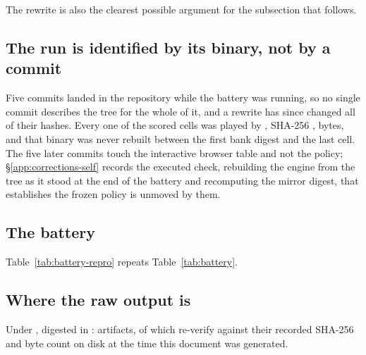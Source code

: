The rewrite is also the clearest possible argument for the subsection that follows.

\subsection*{The run is identified by its binary, not by a commit}

Five commits landed in the repository while the battery was running, so no single commit describes the
tree for the whole of it, and a rewrite has since changed all of their hashes. Every one of the \vsevenScoredCells{} scored cells was played by
, SHA-256 \expandafter\hexdigest\expandafter{\vsevenBinarySha}, \vsevenBinaryBytes{} bytes, and that
binary was never rebuilt between the first bank digest and the last cell. The five later commits touch
the interactive browser table and not the policy; \S\ref{app:corrections-self} records the executed
check, rebuilding the engine from the tree as it stood at the end of the battery and recomputing the
mirror digest, that establishes the frozen policy is unmoved by them.

\subsection*{The battery}

Table~\ref{tab:battery-repro} repeats Table~\ref{tab:battery}.

\begin{table}[!ht]\centering
\caption{Every registered battery against what was measured. \emph{Registered} is the count the
protocol names, not the count that ran: deviations D1 and D2 add a B5 reference cell and sixteen B9
cells, because without them ``no single leave-one-out drop exceeds the whole'', ``the recovered size
tracks the planted size'' and ``the planted excess resolves to zero'' are not computable from the
cells the protocol lists. No cell was dropped.}
\label{tab:battery-repro}
{\tabfont}
\end{table}

\subsection*{Where the raw output is}

Under , digested in
: \vsevenManifestRuns{} artifacts, of which
\vsevenManifestVerified{} re-verify against their recorded SHA-256 and byte count on disk at the time
this document was generated.


